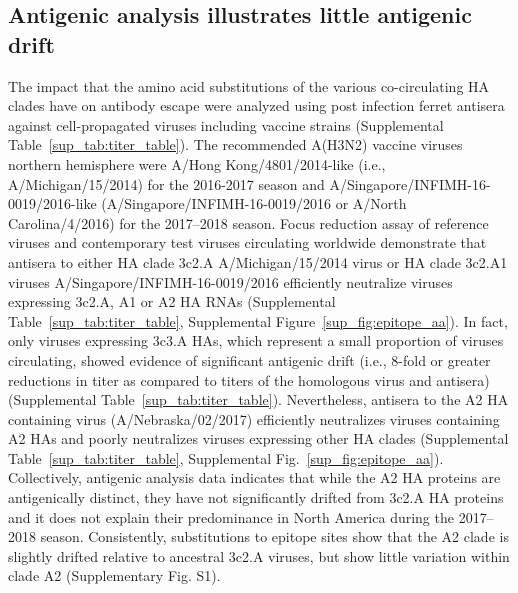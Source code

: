 \subsection*{Antigenic analysis illustrates little antigenic drift}
The impact that the amino acid substitutions of the various co-circulating HA clades have on antibody escape were analyzed using post infection ferret antisera against cell-propagated viruses including vaccine strains (Supplemental Table~\ref{sup_tab:titer_table}).
The recommended A(H3N2) vaccine viruses northern hemisphere were A/Hong Kong/4801/2014-like (i.e., A/Michigan/15/2014) for the 2016-2017 season and A/Singapore/INFIMH-16-0019/2016-like (A/Singapore/INFIMH-16-0019/2016 or A/North Carolina/4/2016) for the 2017--2018 season.
Focus reduction assay of reference viruses and contemporary test viruses circulating worldwide demonstrate that antisera to either HA clade 3c2.A A/Michigan/15/2014 virus or HA clade 3c2.A1 viruses A/Singapore/INFIMH-16-0019/2016 efficiently neutralize viruses expressing 3c2.A, A1 or A2 HA RNAs (Supplemental Table~\ref{sup_tab:titer_table}, Supplemental Figure~\ref{sup_fig:epitope_aa}).
In fact, only viruses expressing 3c3.A HAs, which represent a small proportion of viruses circulating, showed evidence of significant antigenic drift (i.e., 8-fold or greater reductions in titer as compared to titers of the homologous virus and antisera) (Supplemental Table~\ref{sup_tab:titer_table}).
Nevertheless, antisera to the A2 HA containing virus (A/Nebraska/02/2017) efficiently neutralizes viruses containing A2 HAs and poorly neutralizes viruses expressing other HA clades (Supplemental Table~\ref{sup_tab:titer_table}, Supplemental Fig.~\ref{sup_fig:epitope_aa}).
Collectively, antigenic analysis data indicates that while the A2 HA proteins are antigenically distinct, they have not significantly drifted from 3c2.A HA proteins and it does not explain their predominance in North America during the 2017--2018 season.
Consistently, substitutions to epitope sites show that the A2 clade is slightly drifted relative to ancestral 3c2.A viruses, but show little variation within clade A2 (Supplementary Fig. S1).

